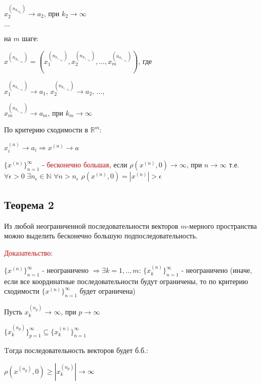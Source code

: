 $x^{(n_{{k_1}_{k_2}})}_2 \rightarrow a_2$, при  $k_2 \rightarrow \infty$

$...$

на $m$ шаге:

$x^{(n_{{{k_1}_{{...}_{k_m}}}})} = (x^{(n_{{{k_1}_{{...}_{k_m}}}})}_1, x^{(n_{{{k_1}_{{...}_{k_m}}}})}_2, ..., x^{(n_{{{k_1}_{{...}_{k_m}}}})}_m)$, где 

$x^{(n_{{{k_1}_{{...}_{k_m}}}})}_1 \rightarrow a_1$, 
$x^{(n_{{{k_1}_{{...}_{k_m}}}})}_2 \rightarrow a_2$,
$...$,

$x^{(n_{{{k_1}_{{...}_{k_m}}}})}_m \rightarrow a_m$, при  $k_m \rightarrow \infty$
\vspace{1cm}

По критерию сходимости в $\mathbb {R}^m$:

$ x^{(n)}_i \rightarrow a_i \Rightarrow x^{(n)} \rightarrow a$
\vspace{1cm}

$\{x^{(n)}\}_{n=1}^{\infty}$ - \textcolor{red}{бесконечно большая}, если $\rho(x^{(n)}, 0) \rightarrow \infty$, при $n \rightarrow \infty$
т.е. $\forall \epsilon > 0$ $\exists n_\epsilon \in \mathbb {N}$ $\forall n>n_\epsilon$ $\rho(x^{(n)}, 0) = |x^{(n)}|>\epsilon$
\vspace{1cm}

\subsection{Теорема 2} Из любой неограниченной последовательности векторов $m$-мерного пространства можно выделить бесконечно большую подпоследовательность.

\textcolor{red}{Доказательство}:

$\{x^{(n)}\}_{n=1}^{\infty}$ - неограничено $\Rightarrow \exists k = 1,..,m$: $\{x_k^{(n)}\}_{n=1}^{\infty}$ - неограничено (иначе, если все координатные последовательности будут ограничены, то по критерию сходимости $\{x^{(n)}\}_{n=1}^{\infty}$ будет ограничена)

Пусть $x_k^{(n_{{p}})} \rightarrow \infty$, при $p \rightarrow \infty$ 

$\{x_k^{(n_p)}\}_{p=1}^{\infty} \subseteq \{x_k^{(n)}\}_{n=1}^{\infty}$

Tогда последовательность векторов будет б.б.:

$ \rho(x^{(n_p)}, 0) \ge |x^{(n_p)}_k| \rightarrow \infty$
